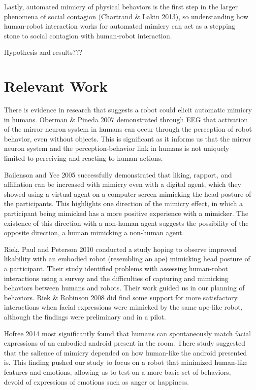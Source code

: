 \documentclass{acm_proc_article-sp}
\begin{document}
Lastly, automated mimicry of physical behaviors is the first step in the larger phenomena of social contagion (Chartrand & Lakin 2013), so understanding how human-robot interaction works for automated mimicry can act as a stepping stone to social contagion with human-robot interaction.

Hypothesis and results???

\section{Relevant Work}
There is evidence in research that suggests a robot could elicit automatic mimicry in humans. Oberman \& Pineda 2007 demonstrated through EEG that activation of the mirror neuron system in humans can occur through the perception of robot behavior, even without objects. This is significant as it informs us that the mirror neuron system and the perception-behavior link in humans is not uniquely limited to perceiving and reacting to human actions. 

Bailenson and Yee 2005 successfully demonstrated that liking, rapport, and affiliation can be increased with mimicry even with a digital agent, which they showed using a virtual agent on a computer screen mimicking the head posture of the participants. This highlights one direction of the mimicry effect, in which a participant being mimicked has a more positive experience with a mimicker. The existence of this direction with a non-human agent suggests the possibility of the opposite direction, a human mimicking a non-human agent. 

Riek, Paul and Peterson 2010 conducted a study hoping to observe improved likability with an embodied robot (resembling an ape) mimicking head posture of a participant. Their study identified problems with assessing human-robot interactions using a survey and the difficulties of capturing and mimicking behaviors between humans and robots. Their work guided us in our planning of behaviors.  Riek \& Robinson 2008 did find some support for more satisfactory interactions when facial expressions were mimicked by the same ape-like robot, although the findings were preliminary and in a pilot.

Hofree 2014 most significantly found that humans can spontaneously match facial expressions of an embodied android present in the room. There study suggested that the salience of mimicry depended on how human-like the android presented is. This finding pushed our study to focus on a robot that minimized human-like features and emotions, allowing us to test on a more basic set of behaviors, devoid of expressions of emotions such as anger or happiness. 
\end{document}
